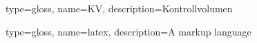 
\makeglossaries

{
  type=gloss,
  name=KV,
  description={Kontrollvolumen}
}

{
	type=gloss,
	name=latex,
	description={A markup language}
}
